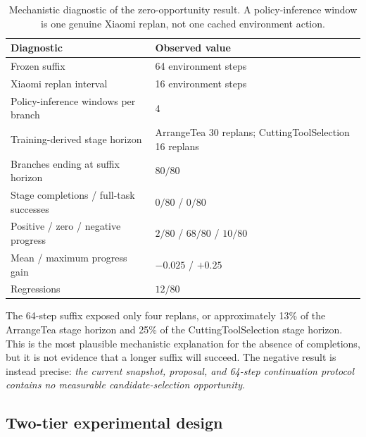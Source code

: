 \begin{table}[H]
\centering
\caption{Mechanistic diagnostic of the zero-opportunity result. A policy-inference window is one genuine Xiaomi replan, not one cached environment action.}
\label{tab:phase3-diagnostic}
\small
\begin{tabularx}{\textwidth}{P{0.44\textwidth}Y}
\toprule
Diagnostic & Observed value \\
\midrule
Frozen suffix & 64 environment steps \\
Xiaomi replan interval & 16 environment steps \\
Policy-inference windows per branch & 4 \\
Training-derived stage horizon & ArrangeTea 30 replans; CuttingToolSelection 16 replans \\
Branches ending at suffix horizon & $80/80$ \\
Stage completions / full-task successes & $0/80$ / $0/80$ \\
Positive / zero / negative progress & $2/80$ / $68/80$ / $10/80$ \\
Mean / maximum progress gain & $-0.025$ / $+0.25$ \\
Regressions & $12/80$ \\
\bottomrule
\end{tabularx}
\end{table}

The 64-step suffix exposed only four replans, or approximately 13\% of the ArrangeTea stage horizon and 25\% of the CuttingToolSelection stage horizon. This is the most plausible mechanistic explanation for the absence of completions, but it is not evidence that a longer suffix will succeed. The negative result is instead precise: \emph{the current snapshot, proposal, and 64-step continuation protocol contains no measurable candidate-selection opportunity}.


\subsection{Two-tier experimental design}

